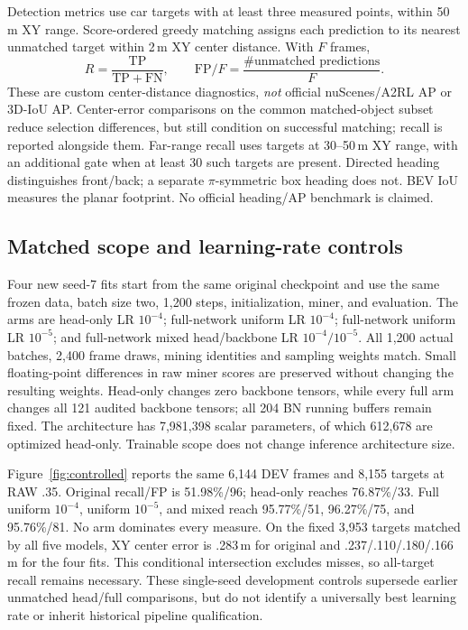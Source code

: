 \documentclass[conference]{IEEEtran}
\newcommand{\FP}{\mathrm{FP}}
\newcommand{\TP}{\mathrm{TP}}
\newcommand{\FN}{\mathrm{FN}}
\begin{document}
Detection metrics use car targets with at least three measured points, within 50\,m XY range. Score-ordered greedy matching assigns each prediction to its nearest unmatched target within 2\,m XY center distance. With $F$ frames,
\begin{equation}
R=\frac{\TP}{\TP+\FN},\qquad \FP/F=\frac{\#\text{unmatched predictions}}{F}.
\end{equation}
These are custom center-distance diagnostics, \emph{not} official nuScenes/A2RL AP or 3D-IoU AP. Center-error comparisons on the common matched-object subset reduce selection differences, but still condition on successful matching; recall is reported alongside them. Far-range recall uses targets at 30--50\,m XY range, with an additional gate when at least 30 such targets are present. Directed heading distinguishes front/back; a separate $\pi$-symmetric box heading does not. BEV IoU measures the planar footprint. No official heading/AP benchmark is claimed.

\subsection{Matched scope and learning-rate controls}
Four new seed-7 fits start from the same original checkpoint and use the same frozen data, batch size two, 1,200 steps, initialization, miner, and evaluation. The arms are head-only LR $10^{-4}$; full-network uniform LR $10^{-4}$; full-network uniform LR $10^{-5}$; and full-network mixed head/backbone LR $10^{-4}/10^{-5}$. All 1,200 actual batches, 2,400 frame draws, mining identities and sampling weights match. Small floating-point differences in raw miner scores are preserved without changing the resulting weights. Head-only changes zero backbone tensors, while every full arm changes all 121 audited backbone tensors; all 204 BN running buffers remain fixed. The architecture has 7,981,398 scalar parameters, of which 612,678 are optimized head-only. Trainable scope does not change inference architecture size.

Figure~\ref{fig:controlled} reports the same 6,144 DEV frames and 8,155 targets at RAW .35. Original recall/FP is 51.98\%/96; head-only reaches 76.87\%/33. Full uniform $10^{-4}$, uniform $10^{-5}$, and mixed reach 95.77\%/51, 96.27\%/75, and 95.76\%/81. No arm dominates every measure. On the fixed 3,953 targets matched by all five models, XY center error is .283\,m for original and .237/.110/.180/.166\,m for the four fits. This conditional intersection excludes misses, so all-target recall remains necessary. These single-seed development controls supersede earlier unmatched head/full comparisons, but do not identify a universally best learning rate or inherit historical pipeline qualification.
\end{document}
